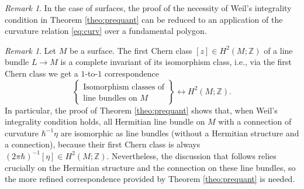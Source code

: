 \documentclass{amsart}
\theoremstyle{definition}
\theoremstyle{remark}
\newtheorem{remark}[theorem]{Remark}
\numberwithin{equation}{section}
\newcommand{\<}{{\langle}}
\renewcommand{\>}{{\rangle}}
\newcommand{\jayadev}[1]{{\color{purple} \sf  J: [#1]}}
\begin{document}
\begin{remark}
    In the case of surfaces, the proof of the necessity of Weil's integrality condition in Theorem \ref{theo:prequant} can be reduced to an application of the curvature relation \eqref{eq:curv} over a fundamental polygon. 
\end{remark}



\begin{remark}\label{rem:chern}
    Let $M$ be a surface. The first Chern class $[z] \in H^2(M;\mathbb{Z})$ of a line bundle $L \to M$ is a complete invariant of its isomorphism class, i.e., via the first Chern class we get a $1$-to-$1$ correspondence
    \[
    \left\lbrace \begin{array}{c}
         \text{Isomorphism classes of} \\
         \text{line bundles on $M$}
    \end{array}
    \right\rbrace \longleftrightarrow H^2(M;\mathbb{Z}).
    \]
    In particular, the proof of Theorem \ref{theo:prequant} shows that, when Weil's integrality condition holds, all Hermitian line bundle on $M$ with a connection of curvature $\hbar^{-1} \eta$ are isomorphic as line bundles (without a Hermitian structure and a connection), because their first Chern class is always $(2\pi\hbar)^{-1}[\eta] \in H^2(M;\mathbb{Z})$. Nevertheless, the discussion that follows relies crucially on the Hermitian structure and the connection on these line bundles, so the more refined correspondence provided by Theorem \ref{theo:prequant} is needed.
\end{remark}

\end{document}
